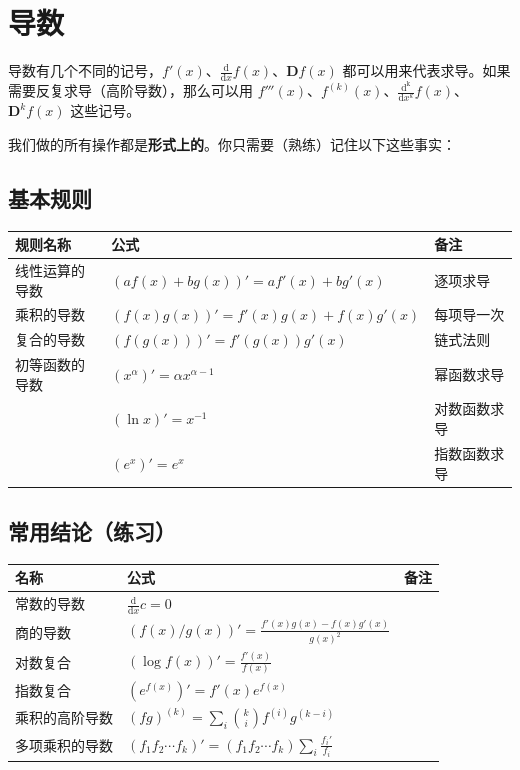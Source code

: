 \documentclass[11pts, a4paper]{ctexart}
\begin{document}
\section{导数}

导数有几个不同的记号，$f'(x)$、$\frac{\mathrm{d}}{\mathrm{d}x} f(x)$、$\mathbf D f(x)$ 都可以用来代表求导。如果需要反复求导（高阶导数），那么可以用 $f'''(x)$、$f^{(k)}(x)$、$\frac{\mathrm{d^k}}{\mathrm{d}x^k} f(x)$、$\mathbf D^k f(x)$ 这些记号。

我们做的所有操作都是\textbf{形式上的}。你只需要（熟练）记住以下这些事实：

\subsection*{基本规则}

\begin{center}
\begin{tabular}{lll}
\toprule
规则名称 & 公式 & 备注 \\
\midrule
线性运算的导数 & $(af(x)+bg(x))'=af'(x)+bg'(x)$ & 逐项求导 \\
乘积的导数 & $(f(x)g(x))'=f'(x)g(x)+f(x)g'(x)$ &  每项导一次\\
复合的导数 & $(f(g(x)))'=f'(g(x))g'(x)$ & 链式法则 \\
初等函数的导数 & $(x^{\alpha})'=\alpha x^{\alpha-1}$ & 幂函数求导 \\
 & $(\ln x)'=x^{-1}$ & 对数函数求导 \\
 & $(e^x)'=e^x$ & 指数函数求导 \\
\bottomrule
\end{tabular}
\end{center}

\subsection*{常用结论（练习）}

\begin{center}
\begin{tabular}{lll}
\toprule
名称 & 公式 & 备注 \\
\midrule
常数的导数 & $\frac{\mathrm{d}}{\mathrm{d}x} c=0$ &  \\
商的导数 & $(f(x)/g(x))'=\frac{f'(x)g(x)-f(x)g'(x)}{g(x)^2}$ &  \\
对数复合 & $(\log f(x))'=\frac{f'(x)}{f(x)}$ &  \\
指数复合 & $(e^{f(x)})'=f'(x)e^{f(x)}$ &  \\
乘积的高阶导数 & $(fg)^{(k)}=\sum_i \binom{k}{i}f^{(i)}g^{(k-i)}$ & \\
多项乘积的导数 & $(f_1f_2\cdots f_k)'=(f_1f_2\cdots f_k)\sum_i\frac{f_i'}{f_i}$ & \\
\bottomrule
\end{tabular}
\end{center}
\end{document}
